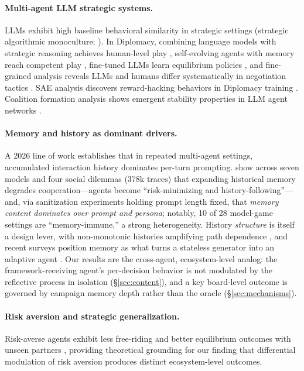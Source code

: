 \documentclass[11pt]{article}
\begin{document}
\paragraph{Multi-agent LLM strategic systems.}
LLMs exhibit high baseline behavioral similarity in strategic settings (strategic algorithmic monoculture; \citealt{Ballestero2026monoculture}). In Diplomacy, combining language models with strategic reasoning achieves human-level play \citep{Bakhtin2022diplomacy}, self-evolving agents with memory reach competent play \citep{Guan2024richelieu}, fine-tuned LLMs learn equilibrium policies \citep{Xu2025dipllm}, and fine-grained analysis reveals LLMs and humans differ systematically in negotiation tactics \citep{Li2025negotiation}. SAE analysis discovers reward-hacking behaviors in Diplomacy training \citep{Yan2026interpretability}. Coalition formation analysis shows emergent stability properties in LLM agent networks \citep{Guo2026coalition}.

\paragraph{Memory and history as dominant drivers.}
A 2026 line of work establishes that in repeated multi-agent settings, accumulated interaction history dominates per-turn prompting. \citet{MemoryCurse2026} show across seven models and four social dilemmas (378k traces) that expanding historical memory degrades cooperation---agents become ``risk-minimizing and history-following''---and, via sanitization experiments holding prompt length fixed, that \emph{memory content dominates over prompt and persona}; notably, 10 of 28 model-game settings are ``memory-immune,'' a strong heterogeneity. History \emph{structure} is itself a design lever, with non-monotonic histories amplifying path dependence \citep{NetworkHistory2025}, and recent surveys position memory as what turns a stateless generator into an adaptive agent \citep{MemorySurvey2026}. Our results are the cross-agent, ecosystem-level analog: the framework-receiving agent's per-decision behavior is not modulated by the reflective process in isolation (\S\ref{sec:content}), and a key board-level outcome is governed by campaign memory depth rather than the oracle (\S\ref{sec:mechanisms}).

\paragraph{Risk aversion and strategic generalization.}
Risk-averse agents exhibit less free-riding and better equilibrium outcomes with unseen partners \citep{Qu2026riskaversion}, providing theoretical grounding for our finding that differential modulation of risk aversion produces distinct ecosystem-level outcomes.
\end{document}
